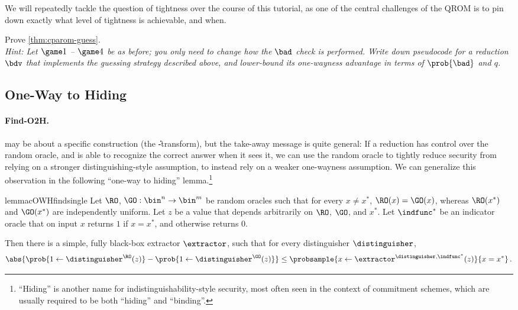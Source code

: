     We will repeatedly tackle the question of tightness over the course of
      this tutorial, as one of the central challenges of the QROM is to pin
      down exactly what level of tightness is achievable, and when.

  \begin{exercise}\label{ex:cparom-lossy}
    Prove \cref{thm:cparom-guess}.\\
    \emph{
      Hint: Let $\game 1$ -- $\game 4$ be as before; you only need to change how
      the $\bad$ check is performed. Write down pseudocode for a
      reduction $\bdv$ that implements the guessing strategy described above, and
      lower-bound its one-wayness advantage in terms of $\prob{\bad}$ and $q$.
    }
  \end{exercise}

\subsection{One-Way to Hiding}\label{sec:C-O2H}
  \paragraph{Find-O2H.}
     may be about a specific construction (the
      \U-transform), but the take-away message is quite general: If a reduction
      has control over the random oracle, and is able to recognize the correct
      answer when it sees it, we can use the random oracle to tightly reduce
      security from relying on a stronger distinguishing-style assumption, to
      instead rely on a weaker one-wayness assumption. 
      We can generalize this observation in the following ``one-way to hiding'' lemma.\footnote{
        ``Hiding'' is another name for indistinguishability-style
        security, most often seen in the context of commitment schemes, which
        are usually required to be both ``hiding'' and ``binding''.
      }

    \begin{restatable}{lemma}{cOWHfindsingle}\label{lemma:co2h-find-single}
      Let $\RO$, $\GO: \bin^n \to \bin^m$ be random
      oracles such that for every $x \neq x^*$, $\RO(x) = \GO(x)$, whereas
      $\RO(x^*)$ and $\GO(x^*)$ are independently uniform. 
      Let $z$ be a value that depends arbitrarily on $\RO$, $\GO$, and $x^*$.
      Let $\indfunc^*$ be an indicator oracle that on input $x$
      returns $1$ if $x = x^*$, and otherwise returns $0$. 

      Then there is a simple, fully black-box extractor $\extractor$,
      such that for every distinguisher $\distinguisher$,
      \[
          \abs{\prob{1 \gets \distinguisher^{\RO}(z)}
              - \prob{1 \gets \distinguisher^{\GO}(z)}}
            \leq \probsample{x \gets \extractor^{\distinguisher, \indfunc^*}(z)}{x = x^*}\, .
      \]
    \end{restatable}

